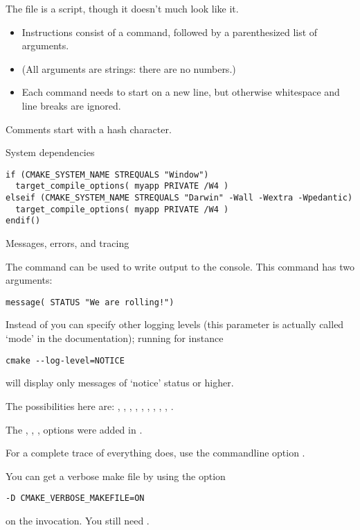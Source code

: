 The  file is a script,
though it doesn't much look like it.
\begin{itemize}
\item
  Instructions consist of a command, followed by a parenthesized
  list of arguments.
\item
  (All arguments are strings: there are no numbers.)
\item
  Each command needs to start on a new line, but otherwise
  whitespace and line breaks are ignored.
\end{itemize}

Comments start with a hash character.

 {System dependencies}

\begin{lstlisting}
if (CMAKE_SYSTEM_NAME STREQUALS "Window")
  target_compile_options( myapp PRIVATE /W4 )
elseif (CMAKE_SYSTEM_NAME STREQUALS "Darwin" -Wall -Wextra -Wpedantic)
  target_compile_options( myapp PRIVATE /W4 )
endif()
\end{lstlisting}

 {Messages, errors, and tracing}

The  command can be used to write output
to the console. This command has two arguments:
\begin{lstlisting}
message( STATUS "We are rolling!")
\end{lstlisting}
Instead of  you can specify other logging levels
(this parameter is actually called `mode' in the documentation);
running for instance
\begin{verbatim}
cmake --log-level=NOTICE
\end{verbatim}
will display only messages of `notice' status or higher.

The possibilities here are: , ,
, , , ,
, , , .

The , , ,  options
were added in .

For a complete trace of everything  does, use
the commandline option .

You can get a verbose make file by using the option
\begin{verbatim}
-D CMAKE_VERBOSE_MAKEFILE=ON
\end{verbatim}
on the  invocation. You still need .

